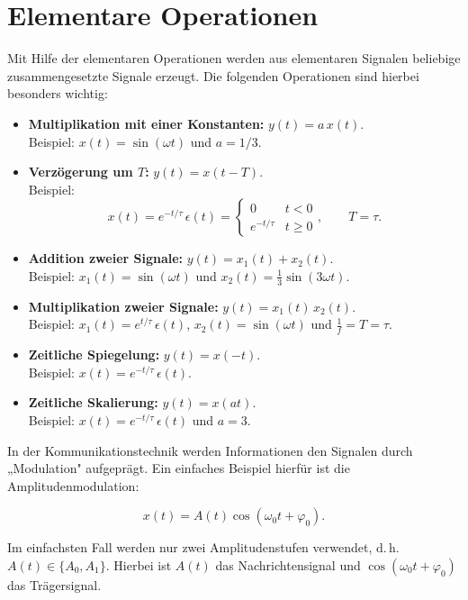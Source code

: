 \section{Elementare Operationen}
\label{sec:elementare-operationen}

Mit Hilfe der elementaren Operationen werden aus elementaren Signalen beliebige zusammengesetzte Signale erzeugt. Die folgenden Operationen sind hierbei besonders wichtig:

\begin{itemize}
  \item \textbf{Multiplikation mit einer Konstanten:} $y(t) = a\,x(t)$.\\
  Beispiel: $x(t) = \sin(\omega t)$ und $a = 1/3$.

  \item \textbf{Verzögerung um $T$:} $y(t) = x(t - T)$.\\
  Beispiel:
  $$
    x(t) = e^{-t/\tau}\,\epsilon(t) = \begin{cases} 0 & t < 0 \\ e^{-t/\tau} & t \geq 0 \end{cases},
    \qquad T = \tau.
  $$

  \item \textbf{Addition zweier Signale:} $y(t) = x_1(t) + x_2(t)$.\\
  Beispiel: $x_1(t) = \sin(\omega t)$ und $x_2(t) = \tfrac{1}{3}\sin(3\omega t)$.

  \item \textbf{Multiplikation zweier Signale:} $y(t) = x_1(t)\,x_2(t)$.\\
  Beispiel: $x_1(t) = e^{t/\tau}\,\epsilon(t)$, $x_2(t) = \sin(\omega t)$ und $\frac{1}{f} = T = \tau$.

  \item \textbf{Zeitliche Spiegelung:} $y(t) = x(-t)$.\\
  Beispiel: $x(t) = e^{-t/\tau}\,\epsilon(t)$.

  \item \textbf{Zeitliche Skalierung:} $y(t) = x(at)$.\\
  Beispiel: $x(t) = e^{-t/\tau}\,\epsilon(t)$ und $a = 3$.
\end{itemize}

\begin{beispiel}
In der Kommunikationstechnik werden Informationen den Signalen durch „Modulation" aufgeprägt. Ein einfaches Beispiel hierfür ist die Amplitudenmodulation:

$$
x(t) = A(t)\cos(\omega_0 t + \varphi_0).
$$

Im einfachsten Fall werden nur zwei Amplitudenstufen verwendet, d.\,h.\ $A(t) \in \{A_0, A_1\}$. Hierbei ist $A(t)$ das Nachrichtensignal und $\cos(\omega_0 t + \varphi_0)$ das Trägersignal.

\end{beispiel}


